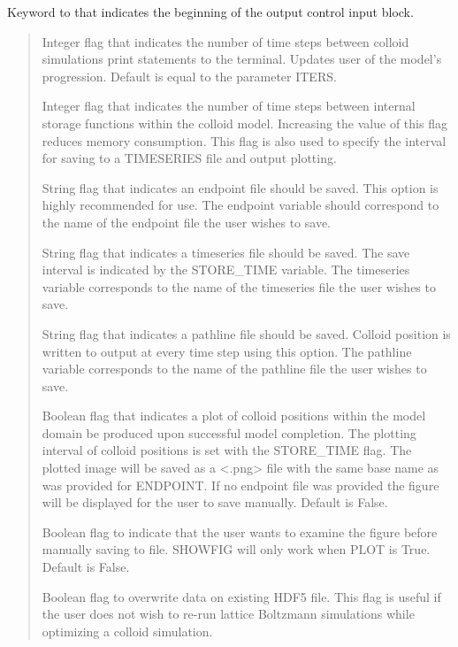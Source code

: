 \documentclass[letterpaper,10pt,english]{sphinxmanual}
\begin{document}
 Keyword to that indicates the
beginning of the output control input block.
\begin{quote}

 Integer flag that indicates the number
of time steps between colloid simulations print statements to the
terminal. Updates user of the model’s progression. Default is equal
to the parameter ITERS.

 Integer flag that indicates the number
of time steps between internal storage functions within the colloid
model. Increasing the value of this flag reduces memory consumption.
This flag is also used to specify the interval for saving to a
TIMESERIES file and output plotting.

 String flag that indicates an endpoint file
should be saved. This option is highly recommended for use. The
endpoint variable should correspond to the name of the endpoint
file the user wishes to save.

 String flag that indicates a timeseries
file should be saved. The save interval is indicated by the
STORE\_TIME variable. The timeseries variable corresponds to the
name of the timeseries file the user wishes to save.

 String flag that indicates a pathline file
should be saved. Colloid position is written to output at every time
step using this option. The pathline variable corresponds to the
name of the pathline file the user wishes to save.

 Boolean flag that indicates a plot of colloid
positions within the model domain be produced upon successful model
completion. The plotting interval of colloid positions is set with
the STORE\_TIME flag. The plotted image will be saved as a \textless{}.png\textgreater{}
file with the same base name as was provided for ENDPOINT. If no
endpoint file was provided the figure will be displayed for the
user to save manually. Default is False.

 Boolean flag to indicate that the user
wants to examine the figure before manually saving to file. SHOWFIG
will only work when PLOT is True. Default is False.

 Boolean flag to overwrite data on
existing HDF5 file. This flag is useful if the user does not wish to
re-run lattice Boltzmann simulations while optimizing a colloid
simulation.
\end{quote}
\end{document}
